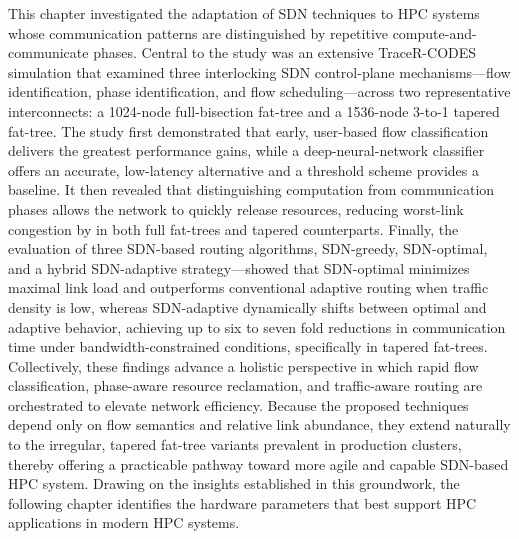 This chapter investigated the adaptation of SDN techniques to HPC systems whose
communication patterns are distinguished by repetitive compute-and-communicate
phases. Central to the study was an extensive TraceR-CODES simulation that
examined three interlocking SDN control-plane mechanisms—flow identification,
phase identification, and flow scheduling—across two representative
interconnects: a 1024-node full-bisection fat-tree and a 1536-node 3-to-1
tapered fat-tree. The study first demonstrated that early, user-based flow
classification delivers the greatest performance gains, while a
deep-neural-network classifier offers an accurate, low-latency alternative and a
threshold scheme provides a baseline. It then revealed that distinguishing
computation from communication phases allows the network to quickly release
resources, reducing worst-link congestion by in both full
fat-trees and tapered counterparts. Finally, the evaluation of
three SDN-based routing algorithms, SDN-greedy, SDN-optimal, and a hybrid
SDN-adaptive strategy—showed that SDN-optimal minimizes maximal link load and
outperforms conventional adaptive routing when traffic density is low, whereas
SDN-adaptive dynamically shifts between optimal and adaptive behavior, achieving
up to six to seven fold reductions in communication time under
bandwidth-constrained conditions, specifically in tapered fat-trees.
Collectively, these findings advance a holistic perspective in which rapid flow
classification, phase-aware resource reclamation, and traffic-aware routing are
orchestrated to elevate network efficiency. Because the proposed techniques
depend only on flow semantics and relative link abundance, they extend naturally
to the irregular, tapered fat-tree variants prevalent in production clusters,
thereby offering a practicable pathway toward more agile and capable SDN-based
HPC system.
Drawing on the insights established in this groundwork, the following chapter identifies 
the hardware parameters that best support HPC applications in modern HPC systems.
